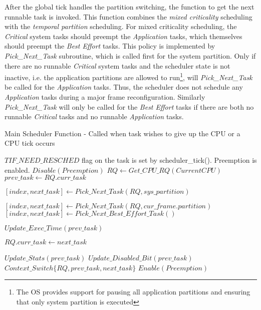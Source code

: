 After the global tick handles the partition switching, the function to
get the next  runnable task is invoked. This function combines the
\emph{mixed criticality} scheduling with the \emph{temporal partition}
scheduling. For mixed
criticality scheduling, the \emph{Critical} system tasks should preempt
the \emph{Application} tasks, which themselves should preempt the
\emph{Best Effort} tasks. This policy is implemented by  \emph{Pick\_Next\_Task} subroutine, which is called first for the system partition.
Only if there are no runnable \emph{Critical} system tasks and the
scheduler state is not inactive, i.e. the application partitions are allowed to run\footnote{The OS provides support for pausing all application partitions and ensuring that only system partition is executed}, will
\emph{Pick\_Next\_Task} be called for the \emph{Application} tasks.
Thus, the scheduler does not schedule any \emph{Application} tasks during
a major frame reconfiguration. Similarly \emph{Pick\_Next\_Task} will
only be called for the \emph{Best Effort} tasks if there are both no
runnable \emph{Critical} tasks and no runnable \emph{Application} tasks.

\iffalse
\begin{algorithm}[t]
\caption{Main Scheduler Function - Called when task wishes to give up the CPU or a CPU tick occurs}
\label{algo:main_sched}
\begin{algorithmic}[1]
\footnotesize
\REQUIRE $TIF\_NEED\_RESCHED$ flag on the task is set by scheduler\_tick(). Preemption is enabled.
\STATE $Disable(Preemption)$
\STATE $ RQ \leftarrow Get\_CPU\_RQ(Current CPU)$
\STATE $prev\_task \leftarrow RQ.curr\_task $

\STATE $[index,next\_task] \leftarrow Pick\_Next\_Task(RQ, sys\_partition)$

\STATE $[index,next\_task] \leftarrow Pick\_Next\_Task(RQ, cur\_frame.partition)$
\STATE $[index,next\_task] \leftarrow Pick\_Next\_Best\_Effort\_Task()$
\ENDIF
\ENDIF

\STATE $Update\_Exec\_Time(prev\_task)$

\STATE $RQ.curr\_task \leftarrow next\_task$

\STATE $Update\_Stats(prev\_task)$
\STATE $Update\_Disabled\_Bit(prev\_task)$
\ENDIF
{}
\STATE $Context\_Switch\{RQ, prev\_task, next\_task\}$
\ENDIF
\STATE $Enable(Preemption)$

\end{algorithmic}

\end{algorithm}

